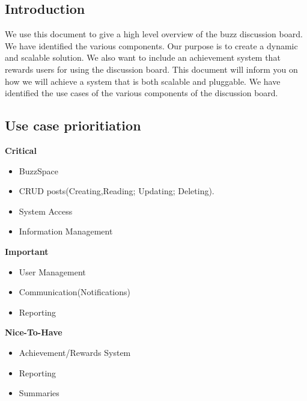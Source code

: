 \documentclass[a4paper,12pt]{report}
\begin{document}
\subsection{Introduction}
We use this document to give a high level overview of the buzz  discussion board. We have identified the various components. Our purpose is to create a dynamic and scalable solution. We also want to include an achievement system that rewards users for using the discussion board. This document will inform you on how we will achieve a system that is both scalable and pluggable. We have identified the use cases of the various components of the discussion board.
\newpage
\subsection{Use case prioritiation}
\textbf{Critical} 
\begin{itemize}
  \item BuzzSpace
  \item CRUD posts(Creating,Reading; Updating; Deleting).
  \item System Access
  \item Information Management
  \end{itemize}
\textbf{Important} 
\begin{itemize}
  \item User Management
  \item Communication(Notifications)
  \item Reporting
\end{itemize}
\textbf{Nice-To-Have} 
\begin{itemize}
  \item Achievement/Rewards System
  \item Reporting
  \item Summaries
\end{itemize}
\end{document}

